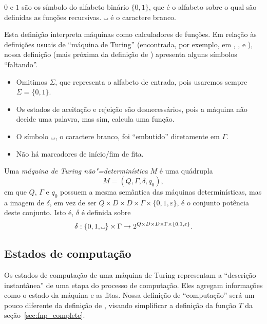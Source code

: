 $0$ e $1$ são os símbolo do alfabeto binário $\{0, 1\}$,
que é o alfabeto sobre o qual são definidas as funções recursivas.
$\B$ é o caractere branco.

Esta definição interpreta máquinas como calculadores de funções.
Em relação às definições usuais de ``máquina de Turing''
(encontrada, por exemplo,
em \cite[p.~148]{HopcroftUllman1979},
\cite[p.~140]{Sipser2006},
e \cite[p.~6]{Kozen2006}),
nossa definição
(mais próxima da definição de )
apresenta alguns símbolos ``faltando''.
\begin{itemize}
    \setlength{\labelsep}{1ex}
    \item Omitimos $\Sigma$, que representa o alfabeto de entrada,
        pois usaremos sempre $\Sigma = \{0, 1\}$.
    \item Os estados de aceitação e rejeição são desnecessários,
        pois a máquina não decide uma palavra,
        mas sim, calcula uma função.
    \item O símbolo $\B$, o caractere branco,
        foi ``embutido'' diretamente em $\Gamma$.
    \item Não há marcadores de início/fim de fita.
\end{itemize}

\begin{definition}
    Uma \emph{máquina de Turing não"=determinística} $M$ é uma quádrupla
    \begin{equation*}
        M = (Q, \Gamma, \delta, q_0),
    \end{equation*}
    em que $Q$, $\Gamma$ e $q_0$ possuem a mesma semântica
    das máquinas determinísticas,
    mas a imagem de $\delta$,
    em vez de ser $Q \times D \times D \times \Gamma \times \{0, 1, \varepsilon\}$,
    é o conjunto potência deste conjunto.
    Isto é, $\delta$ é definida sobre
    \begin{equation*}
        \delta: \{0, 1, \B\} \times \Gamma
            \to 2^{Q \times D \times D \times \Gamma \times \{0, 1, \varepsilon\}}.
    \end{equation*}
\end{definition}

\subsection{Estados de computação}

Os estados de computação de uma máquina de Turing
representam a ``descrição instantânea'' de uma etapa do processo de computação.
Eles agregam informações como o estado da máquina e as fitas.
Nossa definição de ``computação'' será um pouco diferente da definição de
,
visando simplificar a definição da função $T$ da seção~\ref{sec:fnp_complete}.

